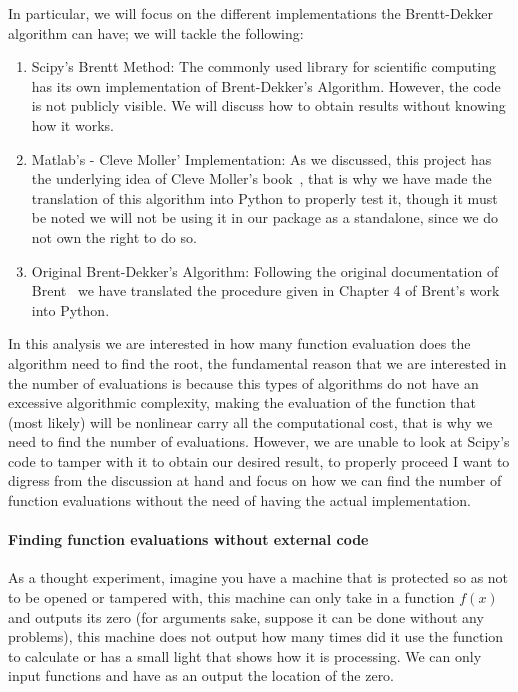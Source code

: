 In particular, we will focus on the different implementations the Brentt-Dekker algorithm can have; we will tackle the following:
\begin{enumerate}
    \item Scipy's Brentt Method: The commonly used library for scientific computing has its own implementation of Brent-Dekker's Algorithm. However, the code is not publicly visible. We will discuss how to obtain results without knowing how it works.
    \item Matlab's - Cleve Moller' Implementation: As we discussed, this project has the underlying idea of Cleve Moller's book~\cite{doi:10.1137/1.9780898717952}, that is why we have made the translation of this algorithm into Python to properly test it, though it must be noted we will not be using it in our package as a standalone, since we do not own the right to do so.
    \item Original Brent-Dekker's Algorithm: Following the original documentation of Brent~\cite{brent2002algorithms} we have translated the procedure given in Chapter 4 of Brent's work into Python.
\end{enumerate}

In this analysis we are interested in how many function evaluation does the algorithm need to find the root, the fundamental reason that we are interested in the number of evaluations is because this types of algorithms do not have an excessive algorithmic complexity, making the evaluation of the function that (most likely) will be nonlinear carry all the computational cost, that is why we need to find the number of evaluations. However, we are unable to look at Scipy's code to tamper with it to obtain our desired result, to properly proceed I want to digress from the discussion at hand and focus on how we can find the number of function evaluations without the need of having the actual implementation.

\paragraph{Finding function evaluations without external code} As a thought experiment, imagine you have a machine that is protected so as not to be opened or tampered with, this machine can only take in a function $f(x)$ and outputs its zero (for arguments sake, suppose it can be done without any problems), this machine does not output how many times did it use the function to calculate or has a small light that shows how it is processing. We can only input functions and have as an output the location of the zero. 




